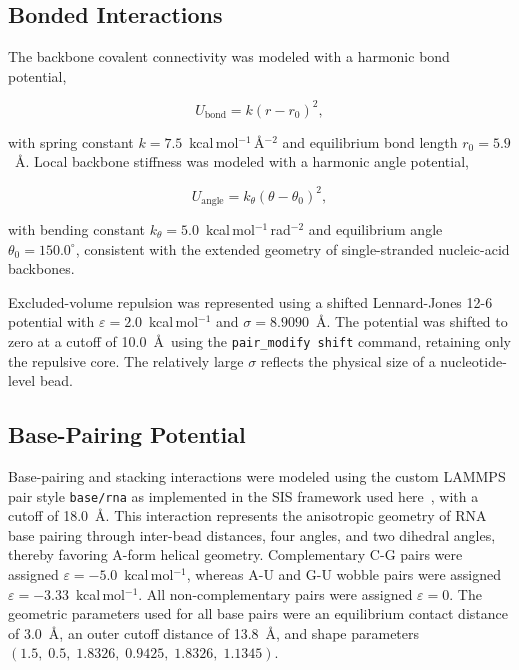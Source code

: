 
\subsection{Bonded Interactions}

The backbone covalent connectivity was modeled with a harmonic bond potential,

\begin{equation}
  U_{\mathrm{bond}} = k(r - r_0)^2,
\end{equation}

with spring constant $k = 7.5$~kcal\,mol$^{-1}$\,\AA$^{-2}$ and equilibrium
bond length $r_0 = 5.9$~\AA. Local backbone stiffness was modeled with a
harmonic angle potential,

\begin{equation}
  U_{\mathrm{angle}} = k_\theta(\theta - \theta_0)^2,
\end{equation}

with bending constant $k_\theta = 5.0$~kcal\,mol$^{-1}$\,rad$^{-2}$ and
equilibrium angle $\theta_0 = 150.0^\circ$, consistent with the extended
geometry of single-stranded nucleic-acid backbones.

Excluded-volume repulsion was represented using a shifted Lennard-Jones 12-6
potential with $\varepsilon = 2.0$~kcal\,mol$^{-1}$ and
$\sigma = 8.9090$~\AA. The potential was shifted to zero at a cutoff of
10.0~\AA\ using the \texttt{pair\_modify shift} command, retaining only the
repulsive core. The relatively large $\sigma$ reflects the physical size of a
nucleotide-level bead.


\subsection{Base-Pairing Potential}

Base-pairing and stacking interactions were modeled using the custom LAMMPS
pair style \texttt{base/rna} as implemented in the SIS framework
used here~\cite{Aierken2024}, with a cutoff of 18.0~\AA. This interaction
represents the anisotropic geometry of RNA base pairing through inter-bead
distances, four angles, and two dihedral angles, thereby favoring A-form
helical geometry. Complementary C-G pairs were assigned
$\varepsilon = -5.0$~kcal\,mol$^{-1}$, whereas A-U and G-U wobble pairs were
assigned $\varepsilon = -3.33$~kcal\,mol$^{-1}$. All non-complementary pairs
were assigned $\varepsilon = 0$. The geometric parameters used for all base
pairs were an equilibrium contact distance of 3.0~\AA, an outer cutoff
distance of 13.8~\AA, and shape parameters
$(1.5,\;0.5,\;1.8326,\;0.9425,\;1.8326,\;1.1345)$.

